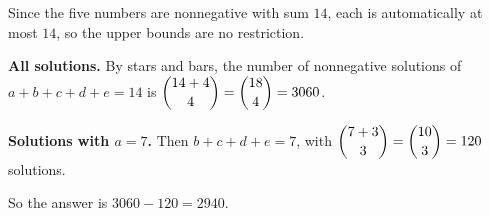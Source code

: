 Since the five numbers are nonnegative with sum $14$, each is automatically at most $14$, so the upper bounds are no restriction.

\textbf{All solutions.} By stars and bars, the number of nonnegative solutions of $a+b+c+d+e=14$ is $\dbinom{14+4}{4}=\dbinom{18}4=3060$.

\textbf{Solutions with $a=7$.} Then $b+c+d+e=7$, with $\dbinom{7+3}{3}=\dbinom{10}3=120$ solutions.

So the answer is $3060-120=\boxed{2940}$.
